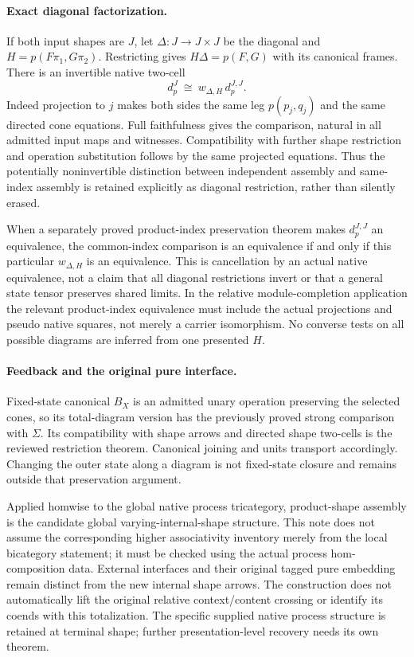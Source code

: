\documentclass{article}
\begin{document}
\paragraph{Exact diagonal factorization.} If both input shapes are $J$, let $\Delta:J\to J\times J$ be the diagonal and $H=p(F\pi_1,G\pi_2)$. Restricting gives $H\Delta=p(F,G)$ with its canonical frames. There is an invertible native two-cell
\[
 d_p^J\ \cong\ w_{\Delta,H}\,d_p^{J,J}.
\]
Indeed projection to $j$ makes both sides the same leg $p(p_j,q_j)$ and the same directed cone equations. Full faithfulness gives the comparison, natural in all admitted input maps and witnesses. Compatibility with further shape restriction and operation substitution follows by the same projected equations. Thus the potentially noninvertible distinction between independent assembly and same-index assembly is retained explicitly as diagonal restriction, rather than silently erased.

When a separately proved product-index preservation theorem makes $d_p^{J,J}$ an equivalence, the common-index comparison is an equivalence if and only if this particular $w_{\Delta,H}$ is an equivalence. This is cancellation by an actual native equivalence, not a claim that all diagonal restrictions invert or that a general state tensor preserves shared limits. In the relative module-completion application the relevant product-index equivalence must include the actual projections and pseudo native squares, not merely a carrier isomorphism. No converse tests on all possible diagrams are inferred from one presented $H$.

\paragraph{Feedback and the original pure interface.} Fixed-state canonical $B_X$ is an admitted unary operation preserving the selected cones, so its total-diagram version has the previously proved strong comparison with $\Sigma$. Its compatibility with shape arrows and directed shape two-cells is the reviewed restriction theorem. Canonical joining and units transport accordingly. Changing the outer state along a diagram is not fixed-state closure and remains outside that preservation argument.

Applied homwise to the global native process tricategory, product-shape assembly is the candidate global varying-internal-shape structure. This note does not assume the corresponding higher associativity inventory merely from the local bicategory statement; it must be checked using the actual process hom-composition data. External interfaces and their original tagged pure embedding remain distinct from the new internal shape arrows. The construction does not automatically lift the original relative context/content crossing or identify its coends with this totalization. The specific supplied native process structure is retained at terminal shape; further presentation-level recovery needs its own theorem.
\end{document}

